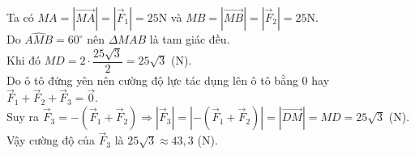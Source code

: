 \begin{bt}
{		Ta có  $MA=\left|\overrightarrow{MA}\right|=\left|\overrightarrow{F}_1\right|=25$N và $MB=\left|\overrightarrow{MB}\right|=\left|\overrightarrow{F}_2\right|=25$N. \\
		Do $\widehat{AMB}=60^\circ$ nên $\Delta  MAB$ là tam giác đều. \\Khi đó $MD=2\cdot \dfrac{25\sqrt{3}}{2}=25\sqrt{3}$ (N).\\
		Do ô tô đứng yên nên cường độ lực tác  dụng lên ô tô bằng $0$ hay $\overrightarrow{F}_1+\overrightarrow{F}_2+\overrightarrow{F}_3=\overrightarrow{0}$.\\
		 Suy ra
		 $\overrightarrow{F}_3=-(\overrightarrow{F}_1+\overrightarrow{F}_2)
		\Rightarrow \left|\overrightarrow{F}_3\right|=\left| -(\overrightarrow{F}_1+\overrightarrow{F}_2)\right| 
		=\left|\overrightarrow{DM}\right|=MD=25\sqrt{3}$  (N).\\
		Vậy cường độ của $\overrightarrow{F}_3$ là $25\sqrt{3}\approx 43{,}3$ (N). 
	} 
\end{bt}

